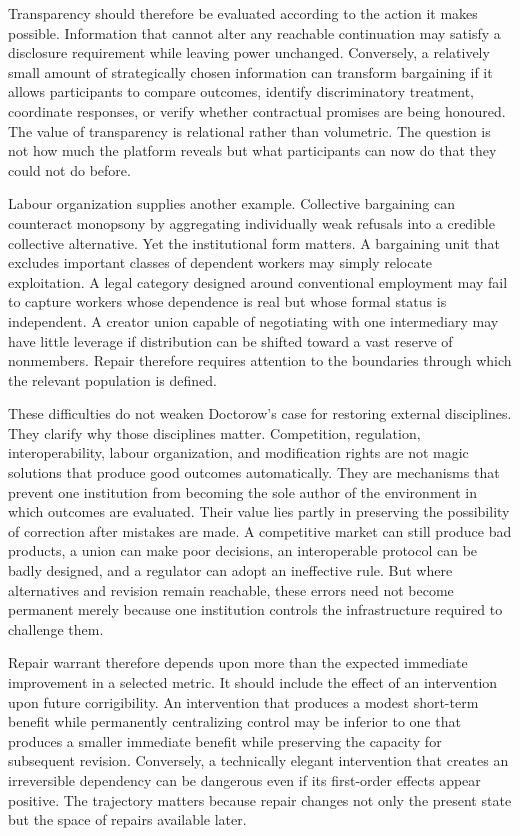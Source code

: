 \documentclass[11pt]{article}
\begin{document}
Transparency should therefore be evaluated according to the action it makes possible. Information that cannot alter any reachable continuation may satisfy a disclosure requirement while leaving power unchanged. Conversely, a relatively small amount of strategically chosen information can transform bargaining if it allows participants to compare outcomes, identify discriminatory treatment, coordinate responses, or verify whether contractual promises are being honoured. The value of transparency is relational rather than volumetric. The question is not how much the platform reveals but what participants can now do that they could not do before.

Labour organization supplies another example. Collective bargaining can counteract monopsony by aggregating individually weak refusals into a credible collective alternative. Yet the institutional form matters. A bargaining unit that excludes important classes of dependent workers may simply relocate exploitation. A legal category designed around conventional employment may fail to capture workers whose dependence is real but whose formal status is independent. A creator union capable of negotiating with one intermediary may have little leverage if distribution can be shifted toward a vast reserve of nonmembers. Repair therefore requires attention to the boundaries through which the relevant population is defined.

These difficulties do not weaken Doctorow's case for restoring external disciplines. They clarify why those disciplines matter. Competition, regulation, interoperability, labour organization, and modification rights are not magic solutions that produce good outcomes automatically. They are mechanisms that prevent one institution from becoming the sole author of the environment in which outcomes are evaluated. Their value lies partly in preserving the possibility of correction after mistakes are made. A competitive market can still produce bad products, a union can make poor decisions, an interoperable protocol can be badly designed, and a regulator can adopt an ineffective rule. But where alternatives and revision remain reachable, these errors need not become permanent merely because one institution controls the infrastructure required to challenge them.

Repair warrant therefore depends upon more than the expected immediate improvement in a selected metric. It should include the effect of an intervention upon future corrigibility. An intervention that produces a modest short-term benefit while permanently centralizing control may be inferior to one that produces a smaller immediate benefit while preserving the capacity for subsequent revision. Conversely, a technically elegant intervention that creates an irreversible dependency can be dangerous even if its first-order effects appear positive. The trajectory matters because repair changes not only the present state but the space of repairs available later.
\end{document}
